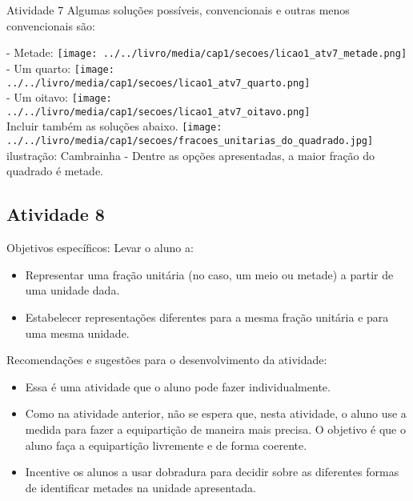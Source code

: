 \documentclass[oneside]{book}
\begin{document}
\begin{multicols}{2}
\begin{resposta*}{Atividade 7}
  Algumas soluções possíveis, convencionais e outras menos convencionais são:

        - Metade:   \mbox{} \newline        \texttt{[image: ../../livro/media/cap1/secoes/licao1\_atv7\_metade.png]}\\
        - Um quarto:  \mbox{} \newline        \texttt{[image: ../../livro/media/cap1/secoes/licao1\_atv7\_quarto.png]}\\
        - Um oitavo:   \mbox{} \newline        \texttt{[image: ../../livro/media/cap1/secoes/licao1\_atv7\_oitavo.png]}\\
        Incluir também as soluções abaixo.  \mbox{} \newline        \texttt{[image: ../../livro/media/cap1/secoes/fracoes\_unitarias\_do\_quadrado.jpg]}\\
        ilustração: Cambrainha
        - Dentre as opções apresentadas, a maior fração do quadrado é metade.
\end{resposta*}






\subsection{Atividade 8}

  Objetivos específicos: Levar o aluno a:
\begin{itemize} %
    \item       Representar uma fração unitária (no caso, um meio ou metade) a partir de uma unidade dada.
    \item       Estabelecer representações diferentes para a mesma fração unitária e para uma mesma unidade.
\end{itemize} %


  Recomendações e sugestões para o desenvolvimento da atividade:
\begin{itemize} %
    \item       Essa é uma atividade que o aluno pode fazer individualmente.
    \item       Como na atividade anterior, não se espera que, nesta atividade, o aluno use a medida para fazer a equipartição de maneira mais precisa. O objetivo é que o aluno faça a equipartição livremente e de forma coerente.
    \item       Incentive os alunos a usar dobradura para decidir sobre as diferentes formas de identificar metades na unidade apresentada.
\end{itemize} %


\end{multicols}
\end{document}
